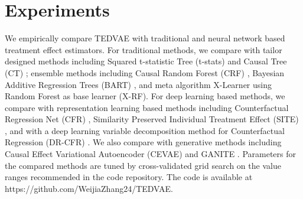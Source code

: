 \documentclass[letterpaper]{article} %
\begin{document}
\section*{Experiments}
We empirically compare TEDVAE with traditional and neural network based treatment effect estimators. 
For traditional methods, we compare with tailor designed methods including Squared t-statistic Tree (t-stats) \cite{Su2009} and Causal Tree (CT) \cite{Athey2015}; ensemble methods including Causal Random Forest (CRF) \cite{Wager2018}, Bayesian Additive Regression Trees (BART) \cite{Hill2011}, and meta algorithm X-Learner \cite{Kuenzel2019} using Random Forest \cite{Breiman1984} as base learner (X-RF).  
For deep learning based methods, we compare with representation learning based methods including Counterfactual Regression Net (CFR) \cite{Shalit2016}, 
Similarity Preserved Individual Treatment Effect (SITE) \cite{Yao2018_Twin}, and with a deep learning variable decomposition method for Counterfactual Regression (DR-CFR) \cite{Hassanpour2020}.
We also compare with generative methods including Causal Effect Variational Autoencoder (CEVAE) \cite{Louizos2017} and GANITE \cite{Yoon2018}.
Parameters for the compared methods are tuned by cross-validated grid search on the value ranges recommended in the code repository. The code is available at https://github.com/WeijiaZhang24/TEDVAE.
\end{document}
